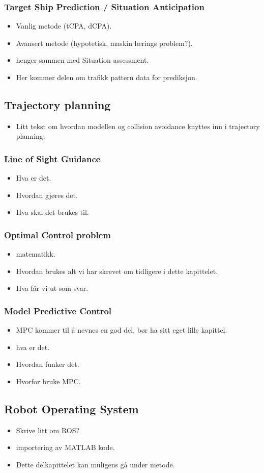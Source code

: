 \subsubsection{Target Ship Prediction / Situation Anticipation}
\begin{itemize}
    \item Vanlig metode (tCPA, dCPA).
    \item Avansert metode (hypotetisk, maskin lærings problem?).
    \item henger sammen med Situation assessment.
    \item Her kommer delen om trafikk pattern data for prediksjon.
\end{itemize}

\subsection{Trajectory planning}
\begin{itemize}
    \item Litt tekst om hvordan modellen og collision avoidance knyttes inn i trajectory planning.
\end{itemize}

\subsubsection{Line of Sight Guidance}
\begin{itemize}
    \item Hva er det.
    \item Hvordan gjøres det.
    \item Hva skal det brukes til.
\end{itemize}

\subsubsection{Optimal Control problem}
\begin{itemize}
    \item matematikk.
    \item Hvordan brukes alt vi har skrevet om tidligere i dette kapittelet.
    \item Hva får vi ut som svar.
\end{itemize}

\subsubsection{Model Predictive Control}
\begin{itemize}
    \item MPC kommer til å nevnes en god del, bør ha sitt eget lille kapittel.
    \item hva er det.
    \item Hvordan funker det.
    \item Hvorfor bruke MPC.
\end{itemize}

\subsection{Robot Operating System}
\begin{itemize}
    \item Skrive litt om ROS?
    \item importering av MATLAB kode.
    \item Dette delkapittelet kan muligens gå under metode.
\end{itemize}

\newpage